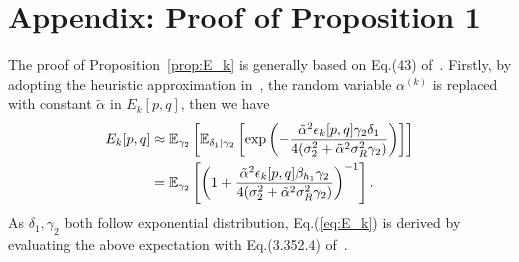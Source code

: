 \documentclass{article}
\begin{document}
\section{Appendix: Proof of Proposition 1}
\label{sec:append}
The proof of Proposition~\ref{prop:E_k} is generally based on Eq.(43)
of~\cite{han2009performance}. Firstly, by adopting the heuristic approximation
in~\cite{jing2006distributed}, the random variable $\alpha^{(k)}$ is replaced
with constant $\tilde{\alpha}$ in $E_k[p, q]$, then we have
\begin{align}
  E_k[p, q] & \approx \mathbb{E}_{\gamma_2}
  \left[
  \mathbb{E}_{\delta_1|\gamma_2}
  \left[
  \exp\left(
  -\frac{\tilde{\alpha}^2\epsilon_k[p,q]\gamma_2 \delta_1}
  {4(\sigma_2^2+\tilde{\alpha}^2\sigma_R^2\gamma_2)}
  \right)
  \right]
  \right] \notag \\
  & = \mathbb{E}_{\gamma_2}
  \left[
  \left(1 + \frac{\tilde{\alpha}^2\epsilon_k[p,q]\beta_{h_1}\gamma_2 }
  {4(\sigma_2^2+\tilde{\alpha}^2\sigma_R^2\gamma_2)}\right)^{-1}
  \right].
\end{align}
As $\delta_1,\gamma_2$ both follow exponential distribution,
Eq.(\ref{eq:E_k}) is derived by evaluating the above expectation with Eq.(3.352.4)
of~\cite{zwillinger2014table}. 







\end{document}
